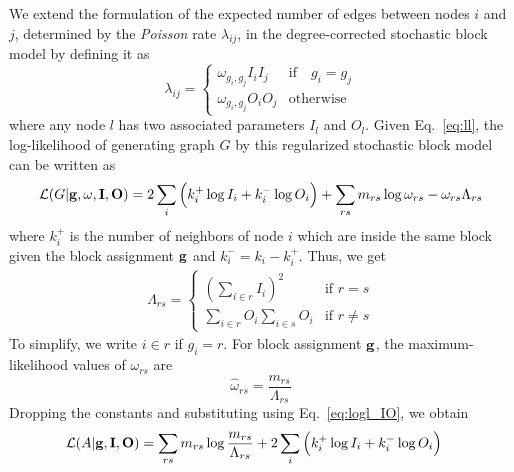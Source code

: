 We extend the formulation of the expected number of edges between nodes $i$ and $j$, determined by the \textit{Poisson} rate $\lambda_{ij}$, in the degree-corrected stochastic block model by defining it as
\begin{equation} \label{eq:theta}
    \lambda_{ij} = 
    \begin{cases}  \omega_{g_i,g_j} I_i I_j    & \mbox{if} \quad g_i=g_j\\
                                 \omega_{g_i,g_j} O_i O_j  & \mbox{otherwise}
    \end{cases}
\end{equation}
where any node $l$ has two associated parameters $I_l$ and $O_l$. Given Eq.~\ref{eq:ll}, the log-likelihood of generating graph $G$ by this regularized stochastic block model can be written as
\begin{align} \label{eq:logl_IO}
    \mathcal{L}(G|{\bf g,\omega, I, O})  = 2\sum_i \Big( k_i^+ \log I_i + k_i^- \log O_i \Big) + \sum_{rs} m_{rs} \log \omega_{rs} - \omega_{rs} \Lambda_{rs} 
\end{align}
where $k_i^+$ is the number of neighbors of node $i$ which are inside the same block given the block assignment $\bf g$ and $k_i^- = k_i - k_i^+$. Thus, we get  
\begin{align}
   \Lambda_{rs} = \begin{cases}  (\sum_{i \in r} I_i)^2   & \mbox{if } r=s \\ 
 \sum_{i \in r} O_{i}  \sum_{i \in s} O_{i} & \mbox{if } r\neq s \end{cases} 
\end{align}
To simplify, we write $i\in r$ if $g_i = r$. For block assignment $\bf g$, the maximum-likelihood values of $\omega_{rs}$ are
\begin{equation} \label{eq:mle_omega}
    \hat{\omega}_{rs} = \frac{m_{rs}}{\Lambda_{rs}}
\end{equation}
Dropping the constants and substituting using Eq.~\ref{eq:logl_IO}, we obtain
\begin{align} \label{eq:important}
    \mathcal{L}(A|{\bf g,I,O})
    &=  \sum_{rs} m_{rs} \log \frac{m_{rs}}{\Lambda_{rs}} + 2\sum_i \Big( k_i^+ \log I_i + k_i^- \log O_i \Big) 
\end{align}

